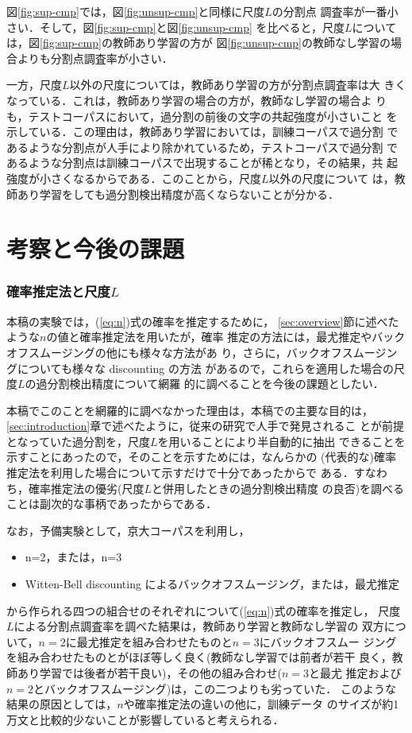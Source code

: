 図\ref{fig:sup-cmp}では，図\ref{fig:unsup-cmp}と同様に尺度$L$の分割点
調査率が一番小さい．そして，図\ref{fig:sup-cmp}と図\ref{fig:unsup-cmp}
を比べると，尺度$L$については，図\ref{fig:sup-cmp}の教師あり学習の方が
図\ref{fig:unsup-cmp}の教師なし学習の場合よりも分割点調査率が小さい．

一方，尺度$L$以外の尺度については，教師あり学習の方が分割点調査率は大
きくなっている．これは，教師あり学習の場合の方が，教師なし学習の場合よ
りも，テストコーパスにおいて，過分割の前後の文字の共起強度が小さいこと
を示している．この理由は，教師あり学習においては，訓練コーパスで過分割
であるような分割点が人手により除かれているため，テストコーパスで過分割
であるような分割点は訓練コーパスで出現することが稀となり，その結果，共
起強度が小さくなるからである．このことから，尺度$L$以外の尺度について
は，教師あり学習をしても過分割検出精度が高くならないことが分かる．


\section{考察と今後の課題}
\label{sec:discussion}

\subsubsection*{確率推定法と尺度$L$}

本稿の実験では，(\ref{eq:n})式の確率を推定するために，
\ref{sec:overview}節に述べたような$n$の値と確率推定法を用いたが，確率
推定の方法には，最尤推定やバックオフスムージングの他にも様々な方法があ
り，さらに，バックオフスムージングについても様々な discounting の方法
があるので，これらを適用した場合の尺度$L$の過分割検出精度について網羅
的に調べることを今後の課題としたい．

本稿でこのことを網羅的に調べなかった理由は，本稿での主要な目的は，
\ref{sec:introduction}章で述べたように，従来の研究で人手で発見されるこ
とが前提となっていた過分割を，尺度$L$を用いることにより半自動的に抽出
できることを示すことにあったので，そのことを示すためには，なんらかの
(代表的な)確率推定法を利用した場合について示すだけで十分であったからで
ある．すなわち，確率推定法の優劣(尺度$L$と併用したときの過分割検出精度
の良否)を調べることは副次的な事柄であったからである．

なお，予備実験として，京大コーパスを利用し，
\begin{itemize}
\item n=2，または，n=3
\item Witten-Bell discounting によるバックオフスムージング，または，最尤推定
\end{itemize}
から作られる四つの組合せのそれぞれについて(\ref{eq:n})式の確率を推定し，
尺度$L$による分割点調査率を調べた結果は，教師あり学習と教師なし学習の
双方について，$n=2$に最尤推定を組み合わせたものと$n=3$にバックオフスムー
ジングを組み合わせたものとがほぼ等しく良く(教師なし学習では前者が若干
良く，教師あり学習では後者が若干良い)，その他の組み合わせ($n=3$と最尤
推定および$n=2$とバックオフスムージング)は，この二つよりも劣っていた．
このような結果の原因としては，$n$や確率推定法の違いの他に，訓練データ
のサイズが約1万文と比較的少ないことが影響していると考えられる．

